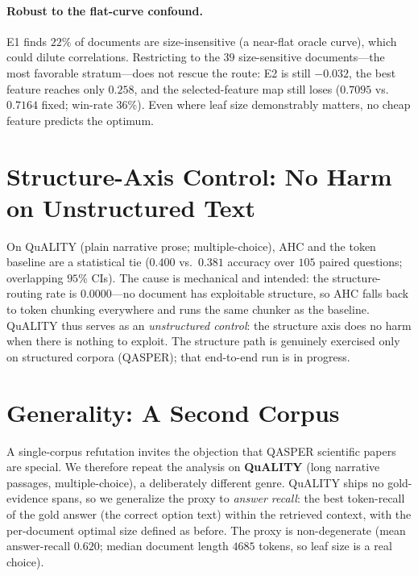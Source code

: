 \documentclass[11pt]{article}
\begin{document}
\paragraph{Robust to the flat-curve confound.} E1 finds $22\%$ of documents are
size-insensitive (a near-flat oracle curve), which could dilute correlations.
Restricting to the $39$ size-sensitive documents---the most favorable stratum---does
not rescue the route: E2 is still $-0.032$, the best feature reaches only $0.258$,
and the selected-feature map still loses ($0.7095$ vs.\ $0.7164$ fixed; win-rate
$36\%$). Even where leaf size demonstrably matters, no cheap feature predicts the
optimum.

\section{Structure-Axis Control: No Harm on Unstructured Text}
\label{sec:control}

On QuALITY (plain narrative prose; multiple-choice), AHC and the token baseline
are a statistical tie ($0.400$ vs.\ $0.381$ accuracy over $105$ paired questions;
overlapping $95\%$ CIs). The cause is mechanical and intended: the
structure-routing rate is $0.0000$---no document has exploitable structure, so AHC
falls back to token chunking everywhere and runs the same chunker as the baseline.
QuALITY thus serves as an \emph{unstructured control}: the structure axis does no
harm when there is nothing to exploit. The structure path is genuinely exercised
only on structured corpora (QASPER); that end-to-end run is in progress.

\section{Generality: A Second Corpus}
\label{sec:generality}

A single-corpus refutation invites the objection that QASPER scientific papers are
special. We therefore repeat the analysis on \textbf{QuALITY} (long narrative
passages, multiple-choice), a deliberately different genre. QuALITY ships no
gold-evidence spans, so we generalize the proxy to \emph{answer recall}: the best
token-recall of the gold answer (the correct option text) within the retrieved
context, with the per-document optimal size defined as before. The proxy is
non-degenerate (mean answer-recall $0.620$; median document length $4685$ tokens,
so leaf size is a real choice).
\end{document}
